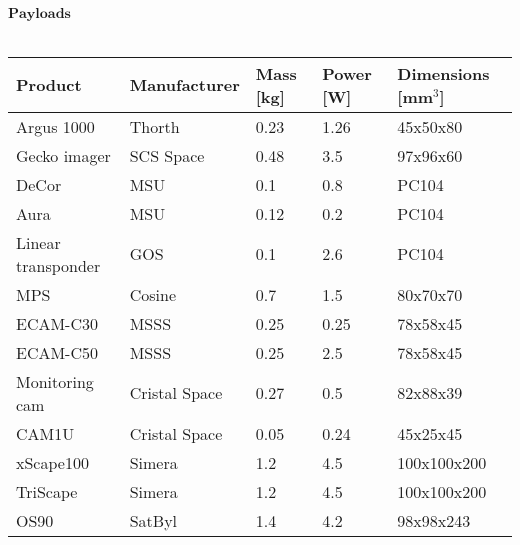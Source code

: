 		      $\textbf{Payloads}$\\ \\
		      \begin{tabular}{p{3cm}p{3cm}p{2cm}p{2cm}p{2cm}} \toprule
		      	Product & Manufacturer & Mass [kg] & Power [W]& Dimensions [mm$^{3}$]\\ \midrule
		      	
		      	Argus 1000 & Thorth & 0.23 & 1.26 & 45x50x80 \\
		      	
		      	Gecko imager & SCS Space & 0.48 & 3.5 & 97x96x60\\
		      	
		      	DeCor & MSU & 0.1 & 0.8 & PC104\\
		      	
		      	Aura & MSU & 0.12 & 0.2 & PC104\\
		      	
		      	Linear transponder & GOS & 0.1 & 2.6 & PC104\\
		      	
		      	MPS & Cosine & 0.7 & 1.5 & 80x70x70\\
		      	
		      	ECAM-C30 & MSSS & 0.25 & 0.25 & 78x58x45\\
		      	
		      	ECAM-C50 & MSSS & 0.25 & 2.5 & 78x58x45\\
		      	
		      	Monitoring cam & Cristal Space & 0.27 & 0.5 & 82x88x39\\
		      	
		      	CAM1U & Cristal Space & 0.05 & 0.24 & 45x25x45\\
		      	
		      	xScape100 & Simera & 1.2 & 4.5 & 100x100x200\\
		      	
		      	TriScape & Simera & 1.2 & 4.5 & 100x100x200\\
		      	
		      	
		      	OS90 & SatByl & 1.4 & 4.2 & 98x98x243\\ \bottomrule
		      	
		     
		      \end{tabular}\\ \\ \\ \\ \\ \\
		      
